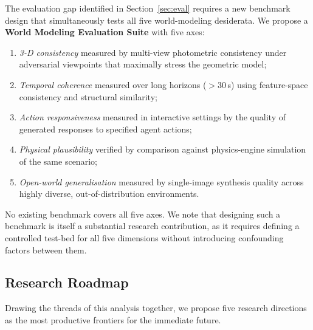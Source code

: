 The evaluation gap identified in Section~\ref{sec:eval} requires a new
benchmark design that simultaneously tests all five world-modeling desiderata.
We propose a \textbf{World Modeling Evaluation Suite} with five axes:
\begin{enumerate}[leftmargin=*,label=(\roman*)]
  \item \emph{3-D consistency} measured by multi-view photometric consistency
    under adversarial viewpoints that maximally stress the geometric model;
  \item \emph{Temporal coherence} measured over long horizons ($>$30\,s) using
    feature-space consistency and structural similarity;
  \item \emph{Action responsiveness} measured in interactive settings by
    the quality of generated responses to specified agent actions;
  \item \emph{Physical plausibility} verified by comparison against
    physics-engine simulation of the same scenario;
  \item \emph{Open-world generalisation} measured by single-image synthesis
    quality across highly diverse, out-of-distribution environments.
\end{enumerate}
No existing benchmark covers all five axes.
We note that designing such a benchmark is itself a substantial research
contribution, as it requires defining a controlled test-bed for all five
dimensions without introducing confounding factors between them.

\subsection{Research Roadmap}

Drawing the threads of this analysis together, we propose five research
directions as the most productive frontiers for the immediate future.

